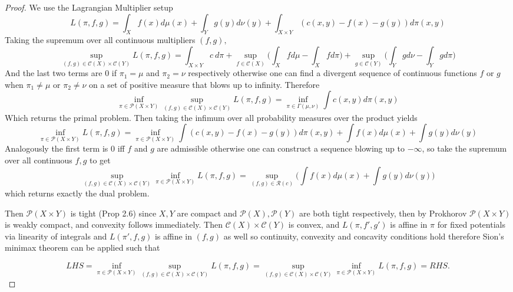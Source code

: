 \documentclass[12pt]{article}
\theoremstyle{definition}
\theoremstyle{plain}
\begin{document}
\begin{spacing}{1}
{\begin{proof}
    We use the Lagrangian Multiplier setup \[
    L(\pi, f, g) = \displaystyle \int_X f(x) d\mu(x) + \int_Y g(y) d\nu(y) + \int_{X \times Y} (c(x, y)-f(x)-g(y))d\pi(x, y)
    \]
    Taking the supremum over all continuous multipliers $(f, g),$
    \[
    \sup_{(f, g) \in \mathcal{C}(X) \times \mathcal{C}(Y)} L(\pi, f, g) = \displaystyle \int_{X \times Y} c \ d\pi + \sup_{f \in \mathcal{C}(X)} \bigg ( \int_X f d\mu - \int_X f d\pi \bigg ) + \sup_{g \in \mathcal{C}(Y)} \bigg ( \int_Y g d\nu - \int_Y g d\pi \bigg )
    \]
    And the last two terms are 0 if $\pi_1 = \mu$ and $\pi_2 = \nu$ respectively otherwise one can find a divergent sequence of continuous functions $f$ or $g$ when $\pi_1 \neq \mu$ or $\pi_2 \neq \nu$ on a set of positive measure that blows up to infinity. Therefore
    \[
    \inf_{\pi \in \mathcal{P}(X \times Y)} \sup_{(f, g) \in \mathcal{C}(X) \times \mathcal{C}(Y)} L(\pi, f, g) = \inf_{\pi \in \Gamma(\mu, \nu)} \int c(x, y) d\pi(x, y)
    \]
    Which returns the primal problem. Then taking the infimum over all probability measures over the product yields
    \[
    \inf_{\pi \in \mathcal{P}(X \times Y)} L(\pi, f, g) = \inf_{\pi \in \mathcal{P}(X \times Y)} \int (c(x, y) - f(x) - g(y))d\pi(x, y) + \int f(x)d\mu(x) + \int g(y)d\nu(y)
    \]
    Analogously the first term is 0 iff $f$ and $g$ are admissible otherwise one can construct a sequence blowing up to $-\infty$, so take the supremum over all continuous $f, g$ to get
    \[
    \sup_{(f, g) \in \mathcal{C}(X) \times \mathcal{C}(Y)} \inf_{\pi \in \mathcal{P}(X \times Y)} L(\pi, f, g) = \sup_{(f, g) \in \mathcal{R}(c)} \bigg (\int f(x)d\mu(x) + \int g(y)d\nu(y) \bigg )
    \]
    which returns exactly the dual problem.
    
    \bigskip
    Then $\mathcal{P}(X \times Y)$ is tight (Prop 2.6) since $X, Y$ are compact and $\mathcal{P}(X), \mathcal{P}(Y)$ are both tight respectively, then by Prokhorov $\mathcal{P}(X \times Y)$ is weakly compact, and convexity follows immediately. Then $\mathcal{C}(X) \times \mathcal{C}(Y)$ is convex, and $L(\pi, f', g')$ is affine in $\pi$ for fixed potentials via linearity of integrals and $L(\pi', f, g)$ is affine in $(f, g)$ as well so continuity, convexity and concavity conditions hold therefore Sion's minimax theorem can be applied such that

    \[
    LHS = \inf_{\pi \in \mathcal{P}(X \times Y)} \sup_{(f, g) \in \mathcal{C}(X) \times \mathcal{C}(Y)} L(\pi, f, g) = \sup_{(f, g) \in \mathcal{C}(X) \times \mathcal{C}(Y)} \inf_{\pi \in \mathcal{P}(X \times Y)} L(\pi, f, g)= RHS.
    \]
\end{proof}

}
\end{spacing}
\end{document}
